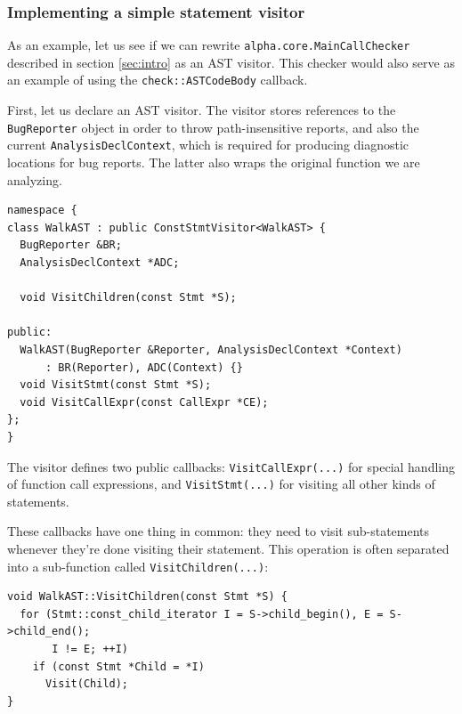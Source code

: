 \documentclass[a4paper,12pt]{article}
\newenvironment{nobr}{\begin{minipage}{\textwidth}\setlength\parskip{1em}
}{\end{minipage}\ignorespacesafterend}
\begin{document}
\subsubsection{Implementing a simple statement visitor}

As an example, let us see if we can rewrite \lstinline|alpha.core.MainCallChecker| described in section \ref{sec:intro} as an AST visitor. This checker would also serve as an example of using the \lstinline|check::ASTCodeBody| callback.

First, let us declare an AST visitor. The visitor stores references to the \lstinline|BugReporter| object in order to throw path-insensitive reports, and also the current \lstinline|AnalysisDeclContext|, which is required for producing diagnostic locations for bug reports. The latter also wraps the original function we are analyzing.

\begin{nobr}
\begin{lstlisting}[style=cplusplus,numbers=none]
namespace {
class WalkAST : public ConstStmtVisitor<WalkAST> {
  BugReporter &BR;
  AnalysisDeclContext *ADC;

  void VisitChildren(const Stmt *S);

public:
  WalkAST(BugReporter &Reporter, AnalysisDeclContext *Context)
      : BR(Reporter), ADC(Context) {}
  void VisitStmt(const Stmt *S);
  void VisitCallExpr(const CallExpr *CE);
};
}
\end{lstlisting}
\end{nobr}

The visitor defines two public callbacks: \lstinline|VisitCallExpr(...)| for special handling of function call expressions, and \lstinline|VisitStmt(...)| for visiting all other kinds of statements.

\begin{nobr}
These callbacks have one thing in common: they need to visit sub-statements whenever they're done visiting their statement. This operation is often separated into a sub-function called \lstinline|VisitChildren(...)|:

\begin{lstlisting}[style=cplusplus,numbers=none]
void WalkAST::VisitChildren(const Stmt *S) {
  for (Stmt::const_child_iterator I = S->child_begin(), E = S->child_end();
       I != E; ++I)
    if (const Stmt *Child = *I)
      Visit(Child);
}
\end{lstlisting}
\end{nobr}
\end{document}
